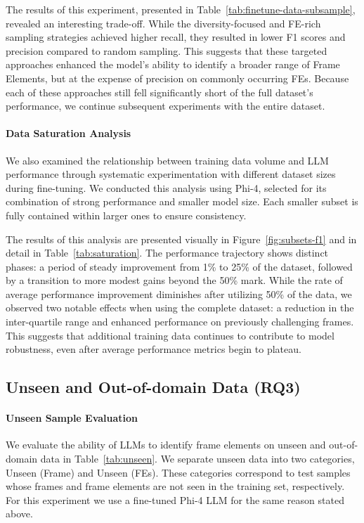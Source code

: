 The results of this experiment, presented in Table~\ref{tab:finetune-data-subsample}, revealed an interesting trade-off. While the diversity-focused and FE-rich sampling strategies achieved higher recall, they resulted in lower F1 scores and precision compared to random sampling. This suggests that these targeted approaches enhanced the model's ability to identify a broader range of Frame Elements, but at the expense of precision on commonly occurring FEs. Because each of these approaches still fell significantly short of the full dataset's performance, we continue subsequent experiments with the entire dataset.



\paragraph{Data Saturation Analysis}
We also examined the relationship between training data volume and LLM performance through systematic experimentation with different dataset sizes during fine-tuning. We conducted this analysis using Phi-4, selected for its combination of strong performance and smaller model size. Each smaller subset is fully contained within larger ones to ensure consistency. 

The results of this analysis are presented visually in Figure~\ref{fig:subsets-f1} and in detail in Table~\ref{tab:saturation}. The performance trajectory shows distinct phases: a period of steady improvement from 1\% to 25\% of the dataset, followed by a transition to more modest gains beyond the 50\% mark. While the rate of average performance improvement diminishes after utilizing 50\% of the data, we observed two notable effects when using the complete dataset: a reduction in the inter-quartile range and enhanced performance on previously challenging frames. This suggests that additional training data continues to contribute to model robustness, even after average performance metrics begin to plateau.


\subsection{Unseen and Out-of-domain Data (RQ3)}
\paragraph{Unseen Sample Evaluation}
We evaluate the ability of LLMs to identify frame elements on unseen and out-of-domain data in Table~\ref{tab:unseen}. We separate unseen data into two categories, Unseen (Frame) and Unseen (FEs). These categories correspond to test samples whose frames and frame elements are not seen in the training set, respectively. For this experiment we use a fine-tuned Phi-4 LLM for the same reason stated above.

